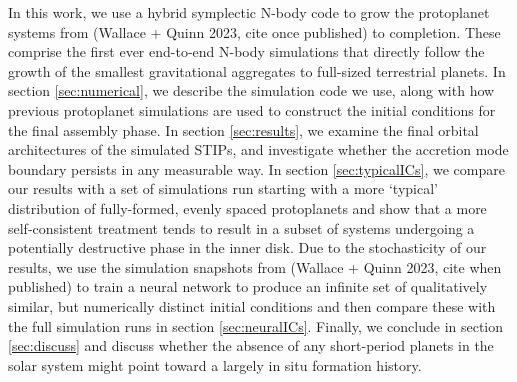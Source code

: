 In this work, we use a hybrid symplectic N-body code to grow the protoplanet systems from (Wallace + Quinn 2023, cite once published) to completion. These comprise the first ever end-to-end N-body simulations that directly follow the growth of the smallest gravitational aggregates to full-sized terrestrial planets. In section \ref{sec:numerical}, we describe the simulation code we use, along with how previous protoplanet simulations are used to construct the initial conditions for the final assembly phase. In section \ref{sec:results}, we examine the final orbital architectures of the simulated STIPs, and investigate whether the accretion mode boundary persists in any measurable way. In section \ref{sec:typicalICs}, we compare our results with a set of simulations run starting with a more `typical' distribution of fully-formed, evenly spaced protoplanets and show that a more self-consistent treatment tends to result in a subset of systems undergoing a potentially destructive phase in the inner disk. Due to the stochasticity of our results, we use the simulation snapshots from (Wallace + Quinn 2023, cite when published) to train a neural network to produce an infinite set of qualitatively similar, but numerically distinct initial conditions and then compare these with the full simulation runs in section \ref{sec:neuralICs}. Finally, we conclude in section \ref{sec:discuss} and discuss whether the absence of any short-period planets in the solar system might point toward a largely in situ formation history.


